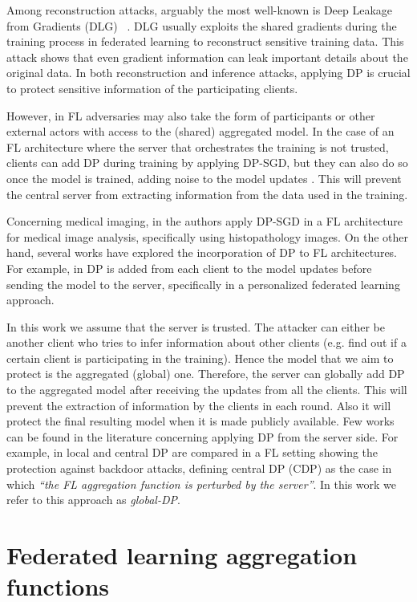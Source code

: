 \documentclass[5p,times]{elsarticle}
\begin{document}
Among reconstruction attacks, arguably the most well-known is Deep Leakage from Gradients (DLG) ~\cite{DLG}. DLG usually exploits the shared gradients during the training process in federated learning to reconstruct sensitive training data. This attack shows that even gradient information can leak important details about the original data. In both reconstruction and inference attacks, applying DP is crucial to protect sensitive information of the participating clients.

However, in FL adversaries may also take the form of participants or other external actors with access to the (shared) aggregated model. In the case of an FL architecture where the server that orchestrates the training is not trusted, clients can add DP during training by applying DP-SGD, but they can also do so once the model is trained, adding noise to the model updates \cite{10386466}. This will prevent the central server from extracting information from the data used in the training. 

Concerning medical imaging, in \cite{adnan2022federated} the authors apply DP-SGD in a FL architecture for medical image analysis, specifically using histopathology images. On the other hand, several works have explored the incorporation of DP to FL architectures. For example, in \cite{9082603} DP is added from each client to the model updates before sending the model to the server, specifically in a personalized federated learning approach.

In this work we assume that the server is trusted. The attacker can either be another client who tries to infer information about other clients (e.g. find out if a certain client is participating in the training). Hence the model that we aim to protect is the aggregated (global) one. Therefore, the server can globally add DP to the aggregated model after receiving the updates from all the clients. This will prevent the extraction of information by the clients in each round. Also it will protect the final resulting model when it is made publicly available.
Few works can be found in the literature concerning applying DP from the server side. For example, in \cite{naseri2020local} local and central DP are compared in a FL setting showing the protection against backdoor attacks, defining central DP (CDP) as the case in which \textit{``the FL aggregation function is perturbed by the server''}. In this work we refer to this approach as \emph{global-DP}.


\section{Federated learning aggregation functions}\label{sec:fl_aggregation}
\end{document}

